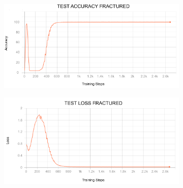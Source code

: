 \begin{figure}[!htb]
	\centering
	\begin{subfigure}{0.49\textwidth}
		\includegraphics[width=\linewidth]{Figures/appendix/fractured_test_accuracy.png} 
	\end{subfigure}
	\begin{subfigure}{0.49\textwidth}
		\includegraphics[width=\linewidth]{Figures/appendix/fractured_test_loss.png}
	\end{subfigure}


\end{figure}
